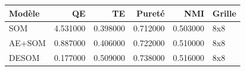 \begin{tabular}{lrrrrl}
\toprule
Modèle & QE & TE & Pureté & NMI & Grille \\
\midrule
SOM & 4.531000 & 0.398000 & 0.712000 & 0.503000 & 8x8 \\
AE+SOM & 0.887000 & 0.406000 & 0.722000 & 0.510000 & 8x8 \\
DESOM & 0.177000 & 0.509000 & 0.738000 & 0.516000 & 8x8 \\
\bottomrule
\end{tabular}
